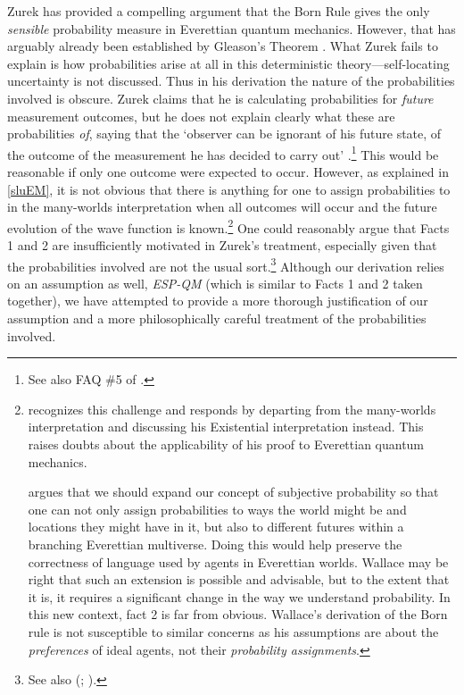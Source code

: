\documentclass[12pt,onecolumn,secnumarabic,amsmath,amssymb,balancelastpage,nofootinbib]{article}
\begin{document}
Zurek has provided a compelling argument that the Born Rule gives the only \emph{sensible} probability measure in Everettian quantum mechanics. However, that has arguably already been established by Gleason's Theorem \citep{gleason}.  What Zurek fails to explain is how probabilities arise at all in this deterministic theory---self-locating uncertainty is not discussed.  Thus in his derivation the nature of the probabilities involved is obscure.  Zurek claims that he is calculating probabilities for \textit{future} measurement outcomes, but he does not explain clearly what these are probabilities \textit{of}, saying that the `observer can be ignorant of his future state, of the outcome of the measurement he has decided to carry out' \citep[][\textsection VII.C]{zurek2005}.\footnote{See also FAQ \#5 of \citep{zurek2010}.}  This would be reasonable if only one outcome were expected to occur.  However, as explained in \textsection \ref{sluEM}, it is not obvious that there is anything for one to assign probabilities to in the many-worlds interpretation when all outcomes will occur and the future evolution of the wave function is known.\footnote{\citet[\textsection III.C]{zurek2005} recognizes this challenge and responds by departing from the many-worlds interpretation and discussing his Existential interpretation instead.  This raises doubts about the applicability of his proof to Everettian quantum mechanics.

\citet[ch. 7, esp. ]{wallace2012} argues that we should expand our concept of subjective probability so that one can not only assign probabilities to ways the world might be and locations they might have in it, but also to different futures within a branching Everettian multiverse.  Doing this would help preserve the correctness of language used by agents in Everettian worlds.  Wallace may be right that such an extension is possible and advisable, but to the extent that it is, it requires a significant change in the way we understand probability.  In this new context, fact 2 is far from obvious.  Wallace's derivation of the Born rule is not susceptible to similar concerns as his assumptions are about the \emph{preferences} of ideal agents, not their \emph{probability assignments}.}  One could reasonably argue that Facts 1 and 2 are insufficiently motivated in Zurek's treatment, especially given that the probabilities involved are not the usual sort.\footnote{See also (\citealp[esp. \textsection III.F2]{schlosshauer2005}; \citealp[]{albert2010}).}  Although our {derivation} relies on an assumption as well, {\emph{ESP-QM}} (which is similar to Facts 1 and 2 taken together), we have attempted to provide a more thorough justification of our assumption and a more philosophically careful treatment of the probabilities involved.
\end{document}
